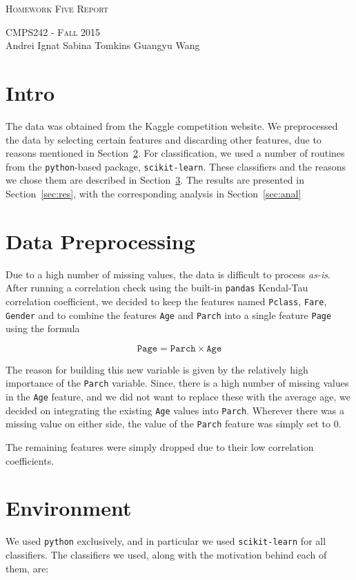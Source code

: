 \documentclass{article}
\begin{document}
\begin{center}
\Huge{\textsc{Homework Five Report}} 

\Large\textsc{CMPS242 - Fall 2015}\\

\large{Andrei Ignat  \hfill Sabina Tomkins \hfill Guangyu Wang} 
\end{center}


\section{Intro}
The data was obtained from the Kaggle competition website. We preprocessed the data by selecting certain features and discarding other features, due to reasons mentioned in Section~\ref{sec:preproc}. For classification, we used a number of routines from the \texttt{python}-based package, \texttt{scikit-learn}. These classifiers and the reasons we chose them are described in Section~\ref{sec:envi}. The results are presented in Section~\ref{sec:res}, with the corresponding analysis in Section~\ref{sec:anal}

\section{Data Preprocessing}
\label{sec:preproc}
Due to a high number of missing values, the data is difficult to process \textit{as-is}. After running a correlation check using the built-in \texttt{pandas} Kendal-Tau correlation coefficient, we decided to keep the features named \texttt{Pclass}, \texttt{Fare}, \texttt{Gender} and to combine the features \texttt{Age} and \texttt{Parch} into a single feature \texttt{Page} using the formula

\[
\mathtt{Page} = \mathtt{Parch} \times \mathtt{Age}  
\]

The reason for building this new variable is given by the relatively high importance of the \texttt{Parch} variable. Since, there is a high number of missing values in the \texttt{Age} feature, and we did not want to replace these with the average age, we decided on integrating the existing \texttt{Age} values into \texttt{Parch}. Wherever there was a missing value on either side, the value of the \texttt{Parch} feature was simply set to 0. 

The remaining features were simply dropped due to their low correlation coefficients.

\section{Environment}
\label{sec:envi}
We used \texttt{python} exclusively, and in particular we used \texttt{scikit-learn} for all classifiers. The classifiers we used, along with the motivation behind each of them, are:
\end{document}
